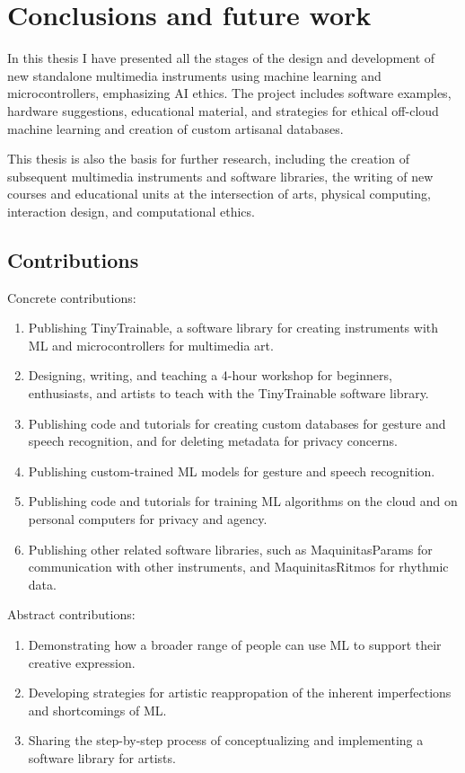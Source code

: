 \chapter{Conclusions and future work}

In this thesis I have presented all the stages of the design and development of new standalone multimedia instruments using machine learning and microcontrollers, emphasizing \acrshort{AI} ethics. The project includes software examples, hardware suggestions, educational material, and strategies for ethical off-cloud machine learning and creation of custom artisanal databases.

This thesis is also the basis for further research, including the creation of subsequent multimedia instruments and software libraries, the writing of new courses and educational units at the intersection of arts, physical computing, interaction design, and computational ethics.

\section{Contributions}

Concrete contributions:

\begin{enumerate}
  \item Publishing TinyTrainable, a software library for creating instruments with  \acrshort{ML} and microcontrollers for multimedia art.
  \item Designing, writing, and teaching a 4-hour workshop for beginners, enthusiasts, and artists to teach with the TinyTrainable software library.
  \item Publishing code and tutorials for creating custom databases for gesture and speech recognition, and for deleting metadata for privacy concerns.
  \item Publishing custom-trained \acrshort{ML} models for gesture and speech recognition.
  \item Publishing code and tutorials for training \acrshort{ML} algorithms on the cloud and on personal computers for privacy and agency.
  \item Publishing other related software libraries, such as MaquinitasParams for communication with other instruments, and MaquinitasRitmos for rhythmic data.
\end{enumerate}

Abstract contributions:

\begin{enumerate}
 \item Demonstrating how a broader range of people can use \acrshort{ML} to support their creative expression.
 \item Developing strategies for artistic reappropation of the inherent imperfections and shortcomings of \acrshort{ML}.
 \item Sharing the step-by-step process of conceptualizing and implementing a software library for artists.
\end{enumerate}

